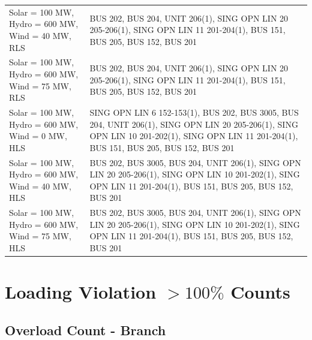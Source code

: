 \documentclass[10pt]{report}
\begin{document}
\begin{table}[H]
{\begin{tabular}{lp{15cm}}
Solar = 100 MW, Hydro = 600 MW, Wind = 40 MW, RLS & BUS 202, BUS 204, UNIT 206(1), SING OPN LIN   20 205-206(1), SING OPN LIN   11 201-204(1), BUS 151, BUS 205, BUS 152, BUS 201 \\
Solar = 100 MW, Hydro = 600 MW, Wind = 75 MW, RLS & BUS 202, BUS 204, UNIT 206(1), SING OPN LIN   20 205-206(1), SING OPN LIN   11 201-204(1), BUS 151, BUS 205, BUS 152, BUS 201 \\
Solar = 100 MW, Hydro = 600 MW, Wind = 0 MW, HLS & SING OPN LIN   6 152-153(1), BUS 202, BUS 3005, BUS 204, UNIT 206(1), SING OPN LIN   20 205-206(1), SING OPN LIN   10 201-202(1), SING OPN LIN   11 201-204(1), BUS 151, BUS 205, BUS 152, BUS 201 \\
Solar = 100 MW, Hydro = 600 MW, Wind = 40 MW, HLS & BUS 202, BUS 3005, BUS 204, UNIT 206(1), SING OPN LIN   20 205-206(1), SING OPN LIN   10 201-202(1), SING OPN LIN   11 201-204(1), BUS 151, BUS 205, BUS 152, BUS 201 \\
Solar = 100 MW, Hydro = 600 MW, Wind = 75 MW, HLS & BUS 202, BUS 3005, BUS 204, UNIT 206(1), SING OPN LIN   20 205-206(1), SING OPN LIN   10 201-202(1), SING OPN LIN   11 201-204(1), BUS 151, BUS 205, BUS 152, BUS 201 \\
\bottomrule
\end{tabular}}
\end{table}

\section{Loading Violation $ > 100\% $ Counts}


\subsection{Overload Count - Branch}
\end{document}
